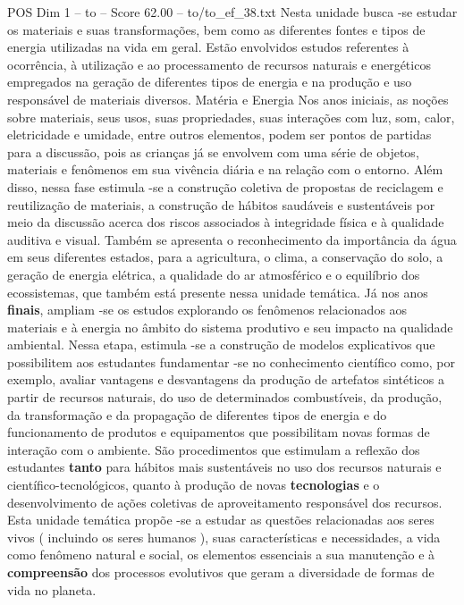\begin{textsample}{POS Dim 1 – to – Score 62.00 – to/to\_ef\_38.txt}  \label{ex:f1_pos_253}
Nesta unidade busca -se estudar os materiais e suas transformações, bem como as diferentes fontes e tipos de energia utilizadas na vida em geral.
Estão envolvidos estudos referentes à ocorrência, à utilização e ao processamento de recursos naturais e energéticos empregados na geração de diferentes tipos de energia e na produção e uso responsável de materiais diversos.
Matéria e Energia Nos anos iniciais, as noções sobre materiais, seus usos, suas propriedades, suas interações com luz, som, calor, eletricidade e umidade, entre outros elementos, podem ser pontos de partidas para a discussão, pois as crianças já se envolvem com uma série de objetos, materiais e fenômenos em sua vivência diária e na relação com o entorno.
Além disso, nessa fase estimula -se a construção coletiva de propostas de reciclagem e reutilização de materiais, a construção de hábitos saudáveis e sustentáveis por meio da discussão acerca dos riscos associados à integridade física e à qualidade auditiva e visual.
Também se apresenta o reconhecimento da importância da água em seus diferentes estados, para a agricultura, o clima, a conservação do solo, a geração de energia elétrica, a qualidade do ar atmosférico e o equilíbrio dos ecossistemas, que também está presente nessa unidade temática.
Já nos anos \textbf{finais}, ampliam -se os estudos explorando os fenômenos relacionados aos materiais e à energia no âmbito do sistema produtivo e seu impacto na qualidade ambiental.
Nessa etapa, estimula -se a construção de modelos explicativos que possibilitem aos estudantes fundamentar -se no conhecimento científico como, por exemplo, avaliar vantagens e desvantagens da produção de artefatos sintéticos a partir de recursos naturais, do uso de determinados combustíveis, da produção, da transformação e da propagação de diferentes tipos de energia e do funcionamento de produtos e equipamentos que possibilitam novas formas de interação com o ambiente.
São procedimentos que estimulam a reflexão dos estudantes \textbf{tanto} para hábitos mais sustentáveis no uso dos recursos naturais e científico-tecnológicos, quanto à produção de novas \textbf{tecnologias} e o desenvolvimento de ações coletivas de aproveitamento responsável dos recursos.
Esta unidade temática propõe -se a estudar as questões relacionadas aos seres vivos ( incluindo os seres humanos ), suas características e necessidades, a vida como fenômeno natural e social, os elementos essenciais a sua manutenção e à \textbf{compreensão} dos processos evolutivos que geram a diversidade de formas de vida no planeta.

\end{textsample}
